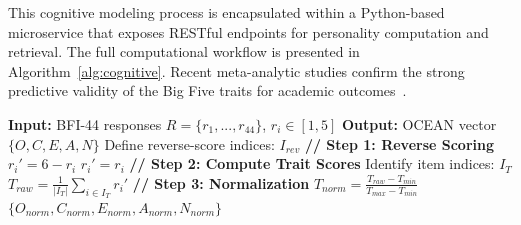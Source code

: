 \documentclass[conference]{IEEEtran}
\begin{document}
This cognitive modeling process is encapsulated within a Python-based microservice that exposes RESTful endpoints for personality computation and retrieval. The full computational workflow is presented in Algorithm~\ref{alg:cognitive}. Recent meta-analytic studies confirm the strong predictive validity of the Big Five traits for academic outcomes~\cite{ref37}.

\begin{table}[H]
\centering
\begin{minipage}{0.48\textwidth}
\begin{algorithmic}[1]
\STATE \textbf{Input:} BFI-44 responses $R = \{r_1, ..., r_{44}\}$, $r_i \in [1,5]$
\STATE \textbf{Output:} OCEAN vector $\{O, C, E, A, N\}$
\STATE
\STATE Define reverse-score indices: $I_{rev}$
\STATE
\STATE \textbf{// Step 1: Reverse Scoring}
    \STATE $r_i' = 6 - r_i$
\ENDFOR
{}
    \STATE $r_i' = r_i$
\ENDFOR
\STATE
\STATE \textbf{// Step 2: Compute Trait Scores}
    \STATE Identify item indices: $I_T$
    \STATE $T_{raw} = \frac{1}{|I_T|} \sum_{i \in I_T} r_i'$
\ENDFOR
\STATE
\STATE \textbf{// Step 3: Normalization}
    \STATE $T_{norm} = \frac{T_{raw} - T_{min}}{T_{max} - T_{min}}$
\ENDFOR
\STATE
\RETURN $\{O_{norm}, C_{norm}, E_{norm}, A_{norm}, N_{norm}\}$
\end{algorithmic}
\label{alg:cognitive}
\end{minipage}
\end{table}
\end{document}
